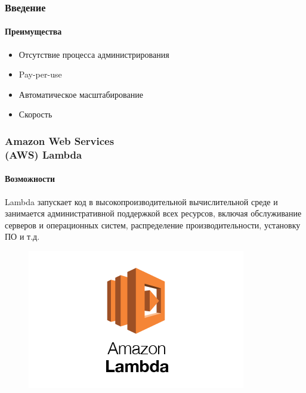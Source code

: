 \documentclass{beamer}
\begin{document}
    \begin{frame}
        \frametitle{Введение}
        \framesubtitle{Преимущества}
        \begin{itemize}
            \item Отсутствие процесса администрирования
            \item Pay-per-use
            \item Автоматическое масштабирование
            \item Скорость
        \end{itemize}
    \end{frame}


    \begin{frame}
        \frametitle{Amazon Web Services\\(AWS) Lambda}
        \framesubtitle{Возможности}
        Lambda запускает код в высокопроизводительной вычислительной среде и занимается административной поддержкой всех ресурсов, включая обслуживание серверов и операционных систем, распределение производительности, установку ПО и т.д.
        \vspace*{-0.6cm}
        \begin{figure}
            \includegraphics[width=0.5\linewidth]{images/awslogo}
        \end{figure}
    \end{frame}
\end{document}
